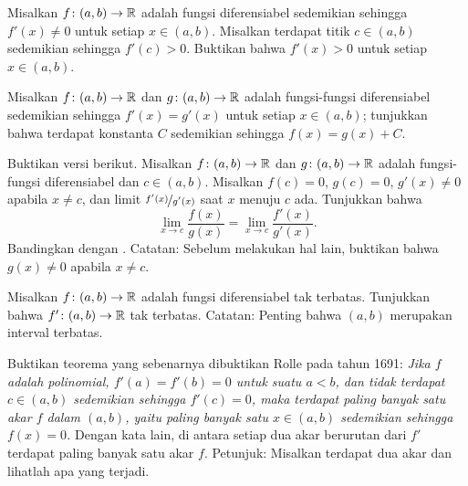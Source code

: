 \begin{exercise}
Misalkan $f \colon (a,b) \to {\mathbb{R}}$ adalah fungsi diferensiabel
sedemikian sehingga
$f'(x) \neq 0$ untuk setiap $x \in (a,b)$.  Misalkan
terdapat
titik $c \in (a,b)$ sedemikian sehingga $f'(c) > 0$.
Buktikan bahwa $f'(x) > 0$ untuk setiap $x \in (a,b)$.
\end{exercise}

\begin{exercise} \label{exercise:samediffconst}
Misalkan $f \colon (a,b) \to {\mathbb{R}}$ dan $g \colon (a,b) \to {\mathbb{R}}$ adalah
fungsi-fungsi diferensiabel sedemikian sehingga $f'(x) = g'(x)$ untuk setiap $x \in (a,b)$;
tunjukkan bahwa terdapat konstanta $C$ sedemikian sehingga $f(x) = g(x) + C$.
\end{exercise}

\begin{exercise}
Buktikan versi  berikut.
Misalkan 
$f \colon (a,b) \to {\mathbb{R}}$ dan $g \colon (a,b) \to {\mathbb{R}}$ adalah fungsi-fungsi
diferensiabel dan $c \in (a,b)$.  Misalkan $f(c) = 0$, $g(c)=0$,
$g'(x) \neq 0$ apabila $x \neq c$, dan
limit $\nicefrac{f'(x)}{g'(x)}$ saat $x$ menuju $c$ ada.  Tunjukkan bahwa
\begin{equation*}
\lim_{x \to c} \frac{f(x)}{g(x)} = 
\lim_{x \to c} \frac{f'(x)}{g'(x)} .
\end{equation*}
Bandingkan dengan .
Catatan: Sebelum melakukan hal lain, buktikan bahwa $g(x) \neq 0$ apabila $x \neq c$.
\end{exercise}

\begin{exercise}
Misalkan $f \colon (a,b) \to {\mathbb{R}}$ adalah fungsi diferensiabel tak terbatas.  Tunjukkan bahwa
$f' \colon (a,b) \to {\mathbb{R}}$ tak terbatas.
Catatan: Penting bahwa $(a,b)$ merupakan interval terbatas.
\end{exercise}

\begin{exercise}
Buktikan teorema yang sebenarnya dibuktikan Rolle pada tahun 1691:
\emph{Jika $f$ adalah polinomial,
$f'(a) = f'(b) = 0$ untuk suatu $a < b$,
dan tidak terdapat $c \in (a,b)$ sedemikian sehingga $f'(c) = 0$,
maka terdapat paling banyak satu akar $f$ dalam $(a,b)$,
yaitu paling banyak satu $x \in (a,b)$ sedemikian sehingga $f(x) = 0$.}
Dengan kata lain, di antara setiap dua akar berurutan dari $f'$ terdapat paling banyak satu
akar $f$.
Petunjuk: Misalkan terdapat dua akar dan lihatlah apa yang terjadi.
\end{exercise}

